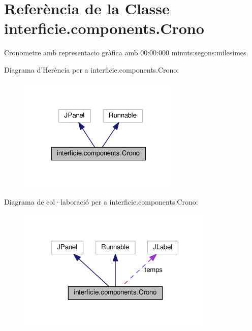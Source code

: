 \hypertarget{classinterficie_1_1components_1_1_crono}{\section{Referència de la Classe interficie.\+components.\+Crono}
\label{classinterficie_1_1components_1_1_crono}
}


Cronometre amb representacio gràfica amb 00\+:00\+:000 minuts\+:segons\+:milesimes.  




Diagrama d'Herència per a interficie.\+components.\+Crono\+:
\nopagebreak
\begin{figure}[H]
\begin{center}
\leavevmode
\includegraphics[width=219pt]{classinterficie_1_1components_1_1_crono__inherit__graph}
\end{center}
\end{figure}


Diagrama de col·laboració per a interficie.\+components.\+Crono\+:
\nopagebreak
\begin{figure}[H]
\begin{center}
\leavevmode
\includegraphics[width=267pt]{classinterficie_1_1components_1_1_crono__coll__graph}
\end{center}
\end{figure}
